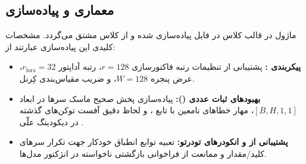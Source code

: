 \subsection{معماری و پیاده‌سازی}
ماژول در قالب کلاس  در فایل  پیاده‌سازی شده و از کلاس  مشتق می‌گردد. مشخصات کلیدی این پیاده‌سازی عبارتند از:
\begin{itemize}
    \item \textbf{پیکربندی :} پشتیبانی از تنظیمات رتبه فاکتورسازی $r=128$، رتبه آداپتور $r_{\text{lora}}=32$، عرض پنجره $W=128$، و ضریب مقیاس‌بندی کِرنل.
    \item \textbf{بهبودهای ثبات عددی ():} پیاده‌سازی پخش صحیح ماسک سرها در ابعاد $[B, H, 1, 1]$، مهار خطاهای نامعین با تابع ، و لحاظ دقیق آفست توکن‌های گذشته در دیکودینگ علّی .
    \item \textbf{پشتیبانی از  و انکودرهای تودرتو:} تعبیه توابع انطباق خودکار جهت تکرار سرهای کلید/مقدار و ممانعت از فراخوانی بازگشتی ناخواسته در انژکتور مدل‌ها.
\end{itemize}
